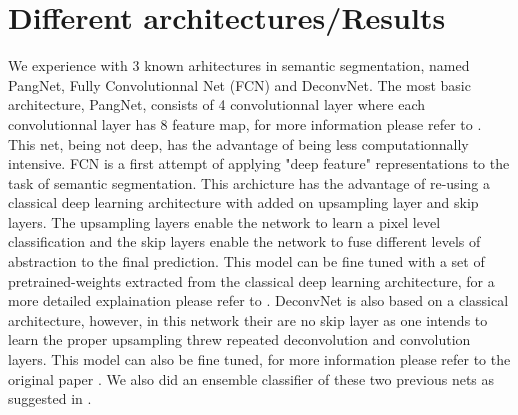 \documentclass{article}
\begin{document}
\section{Different architectures/Results}
\label{sec:results}
We experience with 3 known arhitectures in semantic segmentation, named PangNet, Fully Convolutionnal Net (FCN) and DeconvNet. The most basic architecture, PangNet, consists of 4 
convolutionnal layer where each convolutionnal layer has 8 feature map, for more information please refer to \cite{pang2010cell}. 
This net, being not deep, has the advantage of being less 
computationnally intensive. FCN is a first attempt of applying "deep 
feature" representations to the task of semantic segmentation. This 
archicture has the advantage of re-using a classical deep learning 
architecture with added on upsampling layer and skip layers. The 
upsampling layers enable the network to learn a pixel level classification 
and the skip layers enable the network to fuse different levels of 
abstraction to the final prediction. This model can be fine tuned with a 
set of pretrained-weights extracted from the classical deep learning 
architecture, for a more detailed explaination please refer to \cite{long2015fcn}. DeconvNet is also based on a classical architecture, 
however, in this network their are no skip layer as one intends to learn 
the proper upsampling threw repeated deconvolution and convolution 
layers. This model can also be fine tuned, for more information please 
refer to the original paper \cite{noh2015learning}. We also did an
ensemble classifier of these two previous nets as suggested in 
\cite{noh2015learning}.
\end{document}
